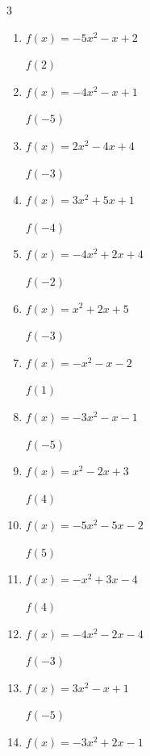 \begin{multicols}{3}
\begin{enumerate}
$f(-3)$
        \phantom{$= 35$}

  \item $f(x)=-5x^{2}-x+2$

$f(2)$
        \phantom{$= -20$}

  \item $f(x)=-4x^{2}-x+1$

$f(-5)$
        \phantom{$= -94$}

  \item $f(x)=2x^{2}-4x+4$

$f(-3)$
        \phantom{$= 34$}

  \item $f(x)=3x^{2}+5x+1$

$f(-4)$
        \phantom{$= 29$}

\columnbreak %

\resetques

  \item $f(x)=-4x^{2}+2x+4$

$f(-2)$
        \phantom{$= -16$}

  \item $f(x)=x^{2}+2x+5$

$f(-3)$
        \phantom{$= 8$}

  \item $f(x)=-x^{2}-x-2$

$f(1)$
        \phantom{$= -4$}

  \item $f(x)=-3x^{2}-x-1$

$f(-5)$
        \phantom{$= -71$}

  \item $f(x)=x^{2}-2x+3$

$f(4)$
        \phantom{$= 11$}

  \item $f(x)=-5x^{2}-5x-2$

$f(5)$
        \phantom{$= -152$}

  \item $f(x)=-x^{2}+3x-4$

$f(4)$
        \phantom{$= -8$}

  \item $f(x)=-4x^{2}-2x-4$

$f(-3)$
        \phantom{$= -34$}

  \item $f(x)=3x^{2}-x+1$

$f(-5)$
        \phantom{$= 81$}

  \item $f(x)=-3x^{2}+2x-1$


\end{enumerate}
\end{multicols}
